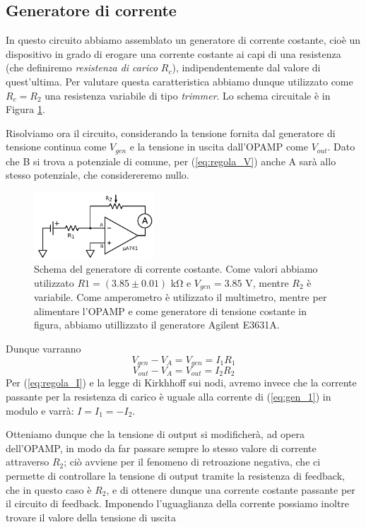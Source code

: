 \subsection{Generatore di corrente}

In questo circuito abbiamo assemblato un generatore di corrente costante, cioè un dispositivo in grado di erogare una corrente costante ai capi di una resistenza (che definiremo \textit{resistenza di carico} $R_c$), indipendentemente dal valore di quest'ultima. Per valutare questa caratteristica abbiamo dunque utilizzato come $R_c=R_2$ una resistenza variabile di tipo \textit{trimmer}. Lo schema circuitale è in Figura \ref{gen_continua}.

Risolviamo ora il circuito, considerando la tensione fornita dal generatore di tensione continua come $V_{gen}$ e la tensione in uscita dall'OPAMP come $V_{out}$. Dato che B si trova a potenziale di comune, per (\ref{eq:regola_V}) anche A sarà allo stesso potenziale, che considereremo nullo.

\begin{figure}
  \begin{center}
    \includegraphics[width=0.40\textwidth]{../E01/latex/c1.pdf}
  \end{center}
  \caption{Schema del generatore di corrente costante. Come valori abbiamo utilizzato $R1=(3.85 \pm 0.01)$ \si{\kilo\ohm} e $V_{gen}=3.85$ \si{\volt}, mentre $R_2$ è variabile. Come amperometro è utilizzato il multimetro, mentre per alimentare l'OPAMP e come generatore di tensione costante in figura, abbiamo utillizzato il generatore Agilent E3631A.}
  \label{gen_continua}
\end{figure}

Dunque varranno
\begin{equation}
V_{gen} - V_A = V_{gen} = I_1 R_1
\label{eq:gen_1}
\end{equation}
$$V_{out} - V_A = V_{out} = I_2 R_2$$
Per (\ref{eq:regola_I}) e la legge di Kirkhhoff sui nodi, avremo invece che la corrente passante per la resistenza di carico è uguale alla corrente di (\ref{eq:gen_1}) in modulo e varrà: $I=I_1=-I_2$.

Otteniamo dunque che la tensione di output si modificherà, ad opera dell'OPAMP, in modo da far passare sempre lo stesso valore di corrente attraverso $R_2$; ciò avviene per il fenomeno di retroazione negativa, che ci permette di controllare la tensione di output tramite la resistenza di feedback, che in questo caso è $R_2$, e di ottenere dunque una corrente costante passante per il circuito di feedback. Imponendo l'uguaglianza della corrente possiamo inoltre trovare il valore della tensione di uscita

